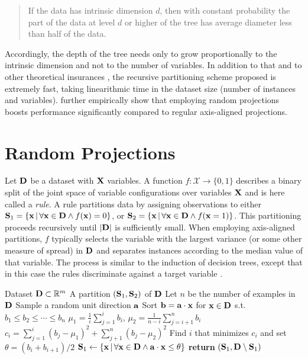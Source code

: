 \begin{quote}
  If the data has intrinsic dimension $d$, then with constant probability the part of the data at
  level $d$ or higher of the tree has average diameter less than half of the data.
\end{quote}

Accordingly, the depth of the tree needs only to grow proportionally to the intrinsic dimension and
not to the number of variables. In addition to that and to other theoretical insurances
\citep{dhesi10}, the recursive partitioning scheme proposed is extremely fast, taking linearithmic
time in the dataset size (number of instances and variables). \citet{dasgupta08a} further
empirically show that employing random projections boosts performance significantly compared to
regular axis-aligned projections.

\section{Random Projections}
\label{sec:rp}

Let $\mathbf{D}$ be a dataset with $\mathbf{X}$ variables. A function $f:\mathcal{X}\to\{0,1\}$ describes
a binary split of the joint space of variable configurations over variables $\mathbf{X}$ and is here
called a \emph{rule}. A rule partitions data by assigning observations to either
$\mathbf{S}_1=\{\mathbf{x}\,|\,\forall\mathbf{x}\in\mathbf{D}\wedge f(\mathbf{x})=0\}$, or
$\mathbf{S}_2=\{\mathbf{x}\,|\,\forall\mathbf{x}\in\mathbf{D}\wedge f(\mathbf{x}=1)\}$. This partitioning proceeds
recursively until $|\mathbf{D}|$ is sufficiently small. When employing axis-aligned partitions, $f$
typically selects the variable with the largest variance (or some other measure of spread) in
$\mathbf{D}$ and separates instances according to the median value of that variable. The process is
similar to the induction of decision trees, except that in this case the rules discriminate against
a target variable \citep{breiman01}.

\begin{algorithm}[t]
  \caption{}\label{alg:splitsid}
  \begin{algorithmic}[1]
    \Require Dataset $\mathbf{D}\subset\mathbb{R}^m$
    \Ensure A partition $(\mathbf{S}_1,\mathbf{S}_2)$ of $\mathbf{D}$
    \State Let $n$ be the number of examples in $\mathbf{D}$
    \State Sample a random unit direction $\mathbf{a}$
    \State Sort $\mathbf{b}=\mathbf{a}\cdot\mathbf{x}$ for $\mathbf{x}\in\mathbf{D}$ s.t.\ $b_1\leq b_2\leq\dotsb\leq b_n$
    \label{alg:splitsid:line:sort}
      \State $\mu_1 = \frac{1}{i}\sum_{j=1}^i b_i$, \; $\mu_2 = \frac{1}{n-i}\sum_{j=i+1}^n b_i$
      \State $c_i = \sum_{j=1}^i (b_j - \mu_1)^2 + \sum_{j+1}^n (b_j - \mu_2)^2$
    \EndFor
    \State Find $i$ that minimizes $c_i$ and set $\theta = (b_i + b_{i+1})/2$
    \State $\mathbf{S}_1 \gets \{\mathbf{x}\,|\,\forall\mathbf{x}\in\mathbf{D}\wedge\mathbf{a}\cdot\mathbf{x}\leq\theta\}$
    \label{alg:splitsid:line:dot}
    \State \textbf{return} $(\mathbf{S}_1,\mathbf{D} \setminus \mathbf{S}_1)$
  \end{algorithmic}
\end{algorithm}

